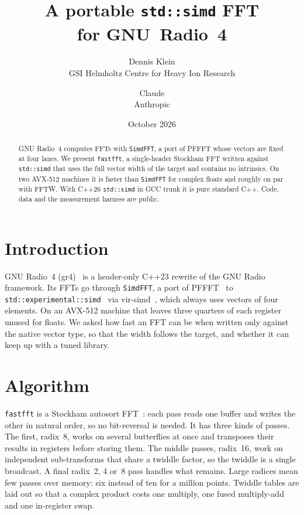 \documentclass[10pt,a4paper,twocolumn]{article}
\title{\vspace{-11mm}\bfseries A portable \texttt{std::simd} FFT\\ for GNU~Radio~4}
\author{Dennis Klein\\{\small GSI Helmholtz Centre for Heavy Ion Research}\\{\small\code{d.klein@gsi.de}} \and Claude\\{\small Anthropic}}
\date{\vspace{-1mm}\small October 2026}
\newcommand{\code}[1]{\texttt{#1}}
\begin{document}
\raggedbottom
\maketitle

\begin{abstract}
\noindent GNU Radio~4 computes FFTs with \code{SimdFFT}, a port of PFFFT whose vectors are fixed at four lanes. We
present \code{fastfft}, a single-header Stockham FFT written against \code{std::simd} that uses the full vector width
of the target and contains no intrinsics. On two AVX-512 machines it is \BothFloatVsGr{} faster than \code{SimdFFT}
for complex floats and roughly on par with FFTW. With C++26 \code{std::simd} in GCC trunk it is pure standard C++.
Code, data and the measurement harness are public.
\end{abstract}

\section{Introduction}
GNU Radio~4 (gr4)~\cite{gr4} is a header-only C++23 rewrite of the GNU Radio framework. Its FFTs go through
\code{SimdFFT}, a port of PFFFT~\cite{pffft} to \code{std::experimental::simd}~\cite{ts} via vir-simd~\cite{vir}, which
always uses vectors of four elements. On an AVX-512 machine that leaves three quarters of each register unused for
floats. We asked how fast an FFT can be when written only against the native vector type, so that the width follows
the target, and whether it can keep up with a tuned library.

\section{Algorithm}\label{sec:alg}
\code{fastfft} is a Stockham autosort FFT~\cite{stockham,vanloan}: each pass reads one buffer and writes the other in
natural order, so no bit-reversal is needed. It has three kinds of passes. The first, radix~8, works on several
butterflies at once and transposes their results in registers before storing them. The middle passes, radix~16, work
on independent sub-transforms that share a twiddle factor, so the twiddle is a single broadcast. A final radix~2, 4
or~8 pass handles what remains. Large radices mean few passes over memory: six instead of ten for a million points.
Twiddle tables are laid out so that a complex product costs one multiply, one fused multiply-add and one in-register
swap.
\end{document}
